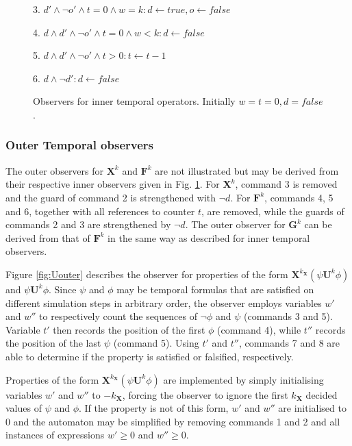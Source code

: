 \documentclass{llncs}
\begin{document}
\begin{figure}
{\begin{minipage}[c]{0.58\columnwidth}
3. $d'\wedge\neg o'\wedge t=0\wedge w=k:d\leftarrow\mathit{true},o\leftarrow\mathit{false}$

4. $d\wedge d'\wedge\neg o'\wedge t=0\wedge w<k:d\leftarrow\mathit{false}$

5. $d\wedge d'\wedge\neg o'\wedge t>0:t\leftarrow t-1$

6. $d\wedge\neg d':d\leftarrow\mathit{false}$\end{minipage}

}



\protect\caption{Observers for inner temporal operators. Initially $w=t=0,d=\mathit{false}$.\label{fig:inner}}
\end{figure}



\subsubsection*{Outer Temporal observers}

The outer observers for $\mathbf{X}^{k}$ and $\mathbf{F}^{k}$ are
not illustrated but may be derived from their respective inner observers
given in Fig. \ref{fig:inner}. For $\mathbf{X}^{k}$, command 3 is
removed and the guard of command 2 is strengthened with $\neg d$.
For $\mathbf{F}^{k}$, commands 4, 5 and 6, together with all references
to counter $t$, are removed, while the guards of commands 2 and 3
are strengthened by $\neg d$. The outer observer for $\mathbf{G}^{k}$
can be derived from that of $\mathbf{F}^{k}$ in the same way as described
for inner temporal observers.

Figure \ref{fig:Uouter} describes the observer for properties of
the form $\mathbf{X}^{k_{\mathbf{X}}}(\psi\mathbf{U}^{k}\phi)$ and
$\psi\mathbf{U}^{k}\phi$. Since $\psi$ and $\phi$ may be temporal
formulas that are satisfied on different simulation steps in arbitrary
order, the observer employs variables $w'$ and $w''$ to respectively
count the sequences of $\neg\phi$ and $\psi$ (commands 3 and 5).
Variable $t'$ then records the position of the first $\phi$ (command
4), while $t''$ records the position of the last $\psi$ (command
5). Using $t'$ and $t''$, commands 7 and 8 are able to determine
if the property is satisfied or falsified, respectively.

Properties of the form $\mathbf{X}^{k_{\mathbf{X}}}(\psi\mathbf{U}^{k}\phi)$
are implemented by simply initialising variables $w'$ and $w''$
to $-k_{\mathbf{X}}$, forcing the observer to ignore the first $k_{\mathbf{X}}$
decided values of $\psi$ and $\phi$. If the property is not of this
form, $w'$ and $w''$ are initialised to 0 and the automaton may
be simplified by removing commands 1 and 2 and all instances of expressions
$w'\geq0$ and $w''\geq0$.
\end{document}
